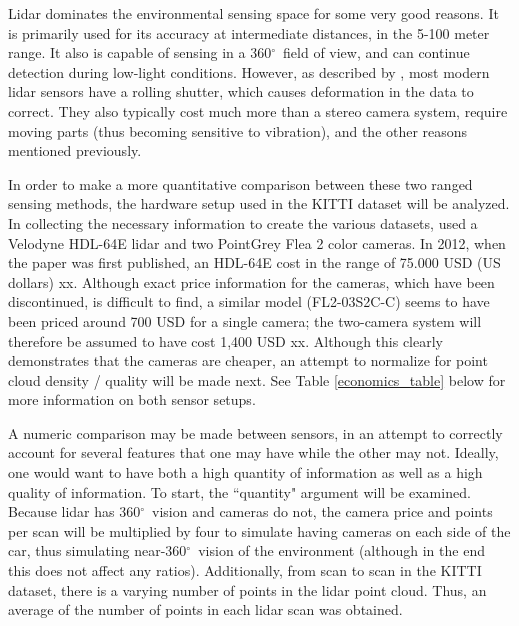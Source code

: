 \def \deg {$ ^{\circ}$\ } %
Lidar dominates the environmental sensing space for some very good reasons. It is primarily used for its accuracy at intermediate distances, in the 5-100 meter range. It also is capable of sensing in a 360\deg field of view, and can continue detection during low-light conditions. However, as described by \cite{broggi_sensors_2013}, most modern lidar sensors have a rolling shutter, which causes deformation in the data to correct. They also typically cost much more than a stereo camera system, require moving parts (thus becoming sensitive to vibration), and the other reasons mentioned previously.

In order to make a more quantitative comparison between these two ranged sensing methods, the hardware setup used in the KITTI dataset will be analyzed. In collecting the necessary information to create the various datasets, \cite{geiger_are_2012} used a Velodyne HDL-64E lidar and two PointGrey Flea 2 color cameras. In 2012, when the paper was first published, an HDL-64E cost in the range of 75.000 USD (US dollars) xx. Although exact price information for the cameras, which have been discontinued, is difficult to find, a similar model (FL2-03S2C-C) seems to have been priced around 700 USD for a single camera; the two-camera system will therefore be assumed to have cost 1,400 USD xx. Although this clearly demonstrates that the cameras are cheaper, an attempt to normalize for point cloud density / quality will be made next. See Table \ref{economics_table} below for more information on both sensor setups.

A numeric comparison may be made between sensors, in an attempt to correctly account for several features that one may have while the other may not. Ideally, one would want to have both a high quantity of information as well as a high quality of information. To start, the ``quantity" argument will be examined. Because lidar has 360\deg vision and cameras do not, the camera price and points per scan will be multiplied by four to simulate having cameras on each side of the car, thus simulating near-360\deg vision of the environment (although in the end this does not affect any ratios). Additionally, from scan to scan in the KITTI dataset, there is a varying number of points in the lidar point cloud. Thus, an average of the number of points in each lidar scan was obtained.


